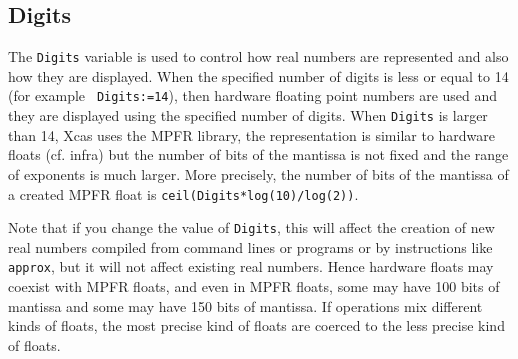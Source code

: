 \documentclass[a4paper,11pt]{book}
\begin{document}
\subsection{Digits}
The {\tt Digits} variable is used to control how real numbers
are represented and also how they are displayed.
When the specified
number of digits is less or equal to 14 (for example {\tt
  Digits:=14}), then hardware floating point
numbers are used and they are displayed using the specified
number of digits.
When {\tt Digits} is larger than 14, Xcas uses the MPFR
library, the representation is similar to hardware floats
(cf. infra) but the number of bits of
the mantissa is not fixed and the range of exponents is much larger.
More precisely, the number of bits of the mantissa of a created MPFR float
is {\tt ceil(Digits*log(10)/log(2))}.

Note that if you change the value of {\tt Digits}, this will affect
the creation of new real numbers compiled from command lines 
or programs or by instructions like {\tt approx}, but it will
not affect existing real numbers. Hence hardware floats may coexist
with MPFR floats, and even in MPFR floats, some may have 100 bits
of mantissa and some may have 150 bits of mantissa. If operations
mix different kinds of floats, the most precise kind of floats
are coerced to the less precise kind of floats.
\end{document}
